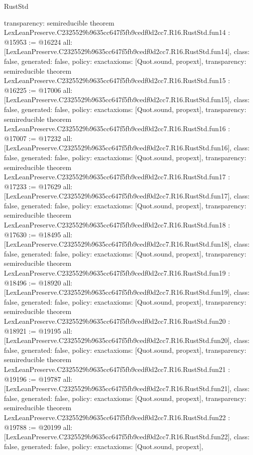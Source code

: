 \begin{lexlean}{RustStd}
\begin{coremodule}
{  transparency: semireducible
}
theorem LexLeanPreserve.C2325529b9635cc647f5fb9cedf0d2cc7.R16.RustStd.fun14 : @15953 := @16224 {
  all: [LexLeanPreserve.C2325529b9635cc647f5fb9cedf0d2cc7.R16.RustStd.fun14],
  class: false,
  generated: false,
  policy: exact{axioms: [Quot.sound, propext]},
  transparency: semireducible
}
theorem LexLeanPreserve.C2325529b9635cc647f5fb9cedf0d2cc7.R16.RustStd.fun15 : @16225 := @17006 {
  all: [LexLeanPreserve.C2325529b9635cc647f5fb9cedf0d2cc7.R16.RustStd.fun15],
  class: false,
  generated: false,
  policy: exact{axioms: [Quot.sound, propext]},
  transparency: semireducible
}
theorem LexLeanPreserve.C2325529b9635cc647f5fb9cedf0d2cc7.R16.RustStd.fun16 : @17007 := @17232 {
  all: [LexLeanPreserve.C2325529b9635cc647f5fb9cedf0d2cc7.R16.RustStd.fun16],
  class: false,
  generated: false,
  policy: exact{axioms: [Quot.sound, propext]},
  transparency: semireducible
}
theorem LexLeanPreserve.C2325529b9635cc647f5fb9cedf0d2cc7.R16.RustStd.fun17 : @17233 := @17629 {
  all: [LexLeanPreserve.C2325529b9635cc647f5fb9cedf0d2cc7.R16.RustStd.fun17],
  class: false,
  generated: false,
  policy: exact{axioms: [Quot.sound, propext]},
  transparency: semireducible
}
theorem LexLeanPreserve.C2325529b9635cc647f5fb9cedf0d2cc7.R16.RustStd.fun18 : @17630 := @18495 {
  all: [LexLeanPreserve.C2325529b9635cc647f5fb9cedf0d2cc7.R16.RustStd.fun18],
  class: false,
  generated: false,
  policy: exact{axioms: [Quot.sound, propext]},
  transparency: semireducible
}
theorem LexLeanPreserve.C2325529b9635cc647f5fb9cedf0d2cc7.R16.RustStd.fun19 : @18496 := @18920 {
  all: [LexLeanPreserve.C2325529b9635cc647f5fb9cedf0d2cc7.R16.RustStd.fun19],
  class: false,
  generated: false,
  policy: exact{axioms: [Quot.sound, propext]},
  transparency: semireducible
}
theorem LexLeanPreserve.C2325529b9635cc647f5fb9cedf0d2cc7.R16.RustStd.fun20 : @18921 := @19195 {
  all: [LexLeanPreserve.C2325529b9635cc647f5fb9cedf0d2cc7.R16.RustStd.fun20],
  class: false,
  generated: false,
  policy: exact{axioms: [Quot.sound, propext]},
  transparency: semireducible
}
theorem LexLeanPreserve.C2325529b9635cc647f5fb9cedf0d2cc7.R16.RustStd.fun21 : @19196 := @19787 {
  all: [LexLeanPreserve.C2325529b9635cc647f5fb9cedf0d2cc7.R16.RustStd.fun21],
  class: false,
  generated: false,
  policy: exact{axioms: [Quot.sound, propext]},
  transparency: semireducible
}
theorem LexLeanPreserve.C2325529b9635cc647f5fb9cedf0d2cc7.R16.RustStd.fun22 : @19788 := @20199 {
  all: [LexLeanPreserve.C2325529b9635cc647f5fb9cedf0d2cc7.R16.RustStd.fun22],
  class: false,
  generated: false,
  policy: exact{axioms: [Quot.sound, propext]},
}
\end{coremodule}
\end{lexlean}
